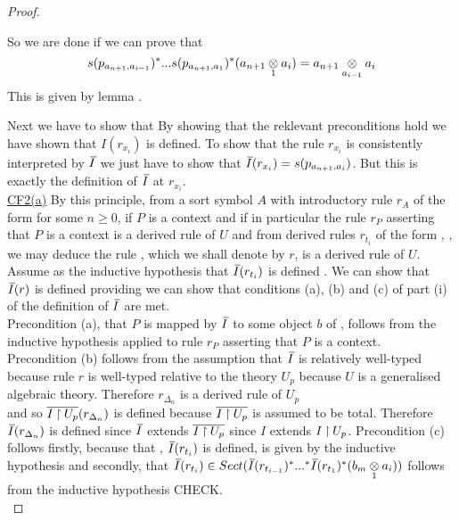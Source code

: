 \begin{proof}
\begin{enumerate}
\begin{equation*}
\end{equation*}
So we are done if we can prove that
\begin{equation*}
s(p_{a_{n+1},a_{i-1}})^*...s(p_{a_{n+1},a_1})^*(a_{n+1} \underset{1}{\otimes} a_i) = a_{n+1} \underset{a_{i-1}}{\otimes} a_i
\end{equation*}  
This is given by lemma .
\end{enumerate}
Next we have to show that 
By showing that the reklevant preconditions hold we have shown that $I(r_{x_i})$ is defined. 
To show that the rule $r_{x_i}$ is consistently interpreted by $\Ibar$ we just have to show that
 $\Ibar(r_{x_i})=s(p_{a_{n+1},a_i})$. But this is exactly the definition of $\Ibar$ at $r_{x_i}$. \\

\underline{CF2(a)}
By this principle, from a sort symbol $A$ with introductory rule $r_A$ of the form  for some $n \geq 0$, if
$P$ is a context and if in particular the rule $r_P$ asserting that $P$ is a context is a derived rule of $U$
and from derived rules $r_{t_i}$ of the form , \foreachi, we may deduce
the rule , which we shall denote by $r$, is a derived rule of $U$. \\

\noindent Assume as the inductive hypothesis that $\Ibar(r_{t_i})$ is defined \foreachi. We can show that $\Ibar(r)$ is defined providing we can show that conditions (a), (b) and (c) of part (i) of the definition of $\Ibar$ are met. \\
\noindent Precondition (a), that $P$ is mapped by $\Ibar$ to some object $b$  of \catc, follows from the inductive hypothesis applied to  rule $r_P$ asserting that $P$ is a context.  \\
\noindent Precondition (b) follows from the assumption that $\Ibar$ is relatively well-typed because rule $r$ is well-typed relative to the theory
$U_p$ because $U$ is a generalised algebraic theory. 
\noindent Therefore $r_{\Delta_n}$ is a derived rule of $U_p$\\ and so $\overline{I \mathbin{\restriction} U_p}(r_{\Delta_n})$ is defined  because $\overline{I \mathbin{\restriction} U_p}$ is assumed to be total. 
Therefore $\Ibar(r_{\Delta_n})$ is defined since
$\Ibar$ extends $\overline{I \mathbin{\restriction} U_p}$ since $I$ extends $I \mathbin{\restriction} U_p$. 
\noindent  Precondition (c) follows firstly, because that \foreachi, $\Ibar(r_{t_i})$ is defined, is given by the inductive hypothesis and 
secondly, that $\Ibar(r_{t_i}) \in Sect(\Ibar(r_{t_{i-1}})^*...^*\Ibar(r_{t_{1}})^*(\crossx{b_m}{a_i}{1}))$ follows  from 
the inductive hypothesis {CHECK}.\\


\end{proof}
